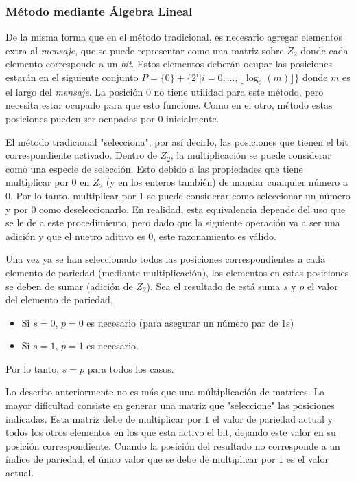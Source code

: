 \documentclass{article}
\begin{document}
\subsubsection{Método mediante Álgebra Lineal}

De la misma forma que en el método tradicional, es necesario agregar elementos extra al \textit{mensaje}, que se puede representar como una matriz sobre $Z_2$ donde cada elemento corresponde a un \textit{bit}. Estos elementos deberán ocupar las posiciones estarán en el siguiente conjunto  $ P = \{0\} + \{ 2^i | i={0, ..., \lfloor\log_2 (m)\rfloor} \} $ donde $m$ es el largo del \textit{mensaje}. La posición $0$ no tiene utilidad para este método, pero necesita estar ocupado para que esto funcione. Como en el otro, método estas posiciones pueden ser ocupadas por 0 inicialmente.

El método tradicional "selecciona", por así decirlo, las posiciones que tienen el bit correspondiente activado. Dentro de $Z_2$, la multiplicación se puede considerar como una especie de selección. Esto debido a las propiedades que tiene multiplicar por $0$ en $Z_2$ (y en los enteros también) de mandar cualquier número a $0$. Por lo tanto, multiplicar por $1$ se puede considerar como seleccionar un número y por $0$ como deseleccionarlo. En realidad, esta equivalencia depende del uso que se le de a este procedimiento, pero dado que la siguiente operación va a ser una adición y que el nuetro aditivo es $0$, este razonamiento es válido.

Una vez ya se han seleccionado todos las posiciones correspondientes a cada elemento de pariedad (mediante multiplicación), los elementos en estas posiciones se deben de sumar (adición de $Z_2$). Sea el resultado de está suma $s$ y $p$ el valor del elemento de pariedad,
\begin{itemize}
    \item Si $s = 0$, $p = 0$ es necesario (para asegurar un número par de $1$s)
    \item Si $s = 1$, $p = 1$ es necesario.
\end{itemize}
Por lo tanto, $s = p$ para todos los casos. 

Lo descrito anteriormente no es más que una múltiplicación de matrices. La mayor dificultad consiste en generar una matriz que "seleccione" las posiciones indicadas. Esta matriz debe de multiplicar por $1$ el valor de pariedad actual y todos los otros elementos en los que esta activo el bit, dejando este valor en su posición correspondiente. Cuando la posición del resultado no corresponde a un índice de pariedad, el único valor que se debe de multiplicar por $1$ es el valor actual.
\end{document}
